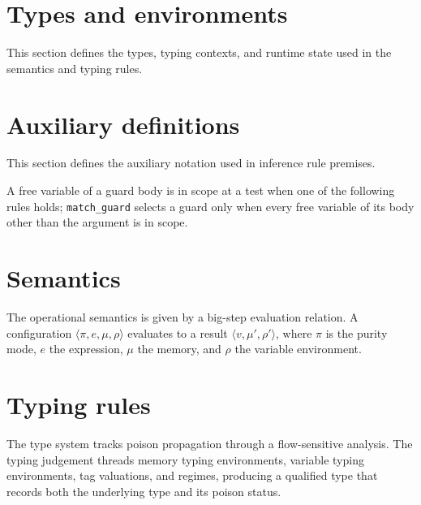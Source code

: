 {{    \section{Types and environments}%
    This section defines the types, typing contexts, and runtime
    state used in the semantics and typing rules.\par\bigskip
    \ottsemanticdomains
    \clearpage
    \section{Auxiliary definitions}%
    This section defines the auxiliary notation used in
    inference rule premises.\par\bigskip
    \ottrulesyntax
    \par\bigskip
    A free variable of a guard body is in scope at a test when one of the
    following rules holds; \texttt{match\_guard} selects a guard only when
    every free variable of its body other than the argument is in
    scope.\par\bigskip
    \ottdefnguardXXinXXscope{}%
    \clearpage
    \section{Semantics}%
    The operational semantics is given by a big-step evaluation relation.
    A configuration $\langle \pi, e, \mu, \rho \rangle$ evaluates to a
    result $\langle v, \mu', \rho' \rangle$, where $\pi$ is the purity
    mode, $e$ the expression, $\mu$ the memory, and $\rho$ the variable
    environment.\par\bigskip
    \ottdefnbeval{}%
    \clearpage
    \setcounter{rulecount}{0}%
    \section{Typing rules}%
    The type system tracks poison propagation through a flow-sensitive
    analysis. The typing judgement threads memory typing environments,
    variable typing environments, tag valuations, and regimes, producing
    a qualified type that records both the underlying type and its poison
    status.\par\bigskip
    \ottdefntyping{}
  }
}
